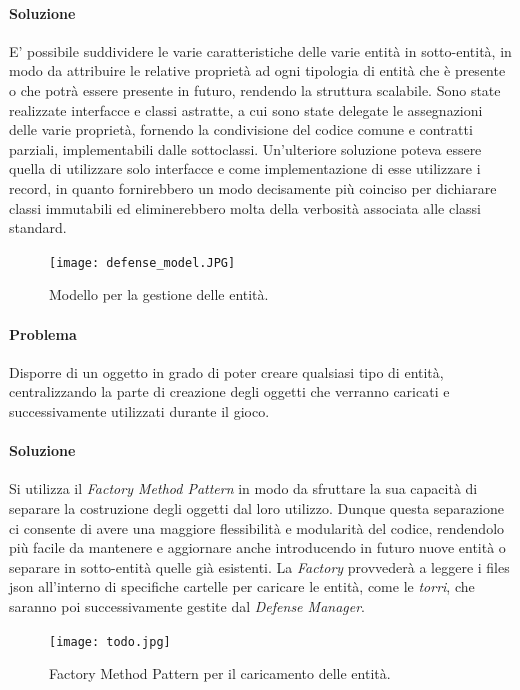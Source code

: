 \documentclass[a4paper,12pt]{report}
\begin{document}
\paragraph{Soluzione}
E' possibile suddividere le varie caratteristiche delle varie entità in sotto-entità, in modo da attribuire le relative proprietà ad ogni tipologia di entità che è presente
o che potrà essere presente in futuro, rendendo la struttura scalabile. Sono state realizzate interfacce e classi astratte, a cui sono state delegate le assegnazioni delle varie proprietà, fornendo la condivisione del codice comune e contratti parziali, implementabili dalle sottoclassi.
Un'ulteriore soluzione poteva essere quella di utilizzare solo interfacce e come implementazione di esse utilizzare i record, in quanto fornirebbero un modo decisamente più coinciso per dichiarare classi immutabili ed eliminerebbero molta della verbosità associata alle classi standard.

\begin{figure}[H]
    \centering
    \texttt{[image: defense\_model.JPG]}
    \caption{Modello per la gestione delle entità.}
    \label{fig:defense-model}
\end{figure}

\vspace{15mm}

\paragraph{Problema}
Disporre di un oggetto in grado di poter creare qualsiasi tipo di entità, centralizzando la parte di creazione degli oggetti che verranno caricati e successivamente utilizzati durante il gioco.

\paragraph{Soluzione}
Si utilizza il \textit{Factory Method Pattern} in modo da sfruttare la sua capacità di separare la costruzione degli oggetti dal loro utilizzo. Dunque questa separazione ci consente di avere una maggiore flessibilità e modularità del codice, rendendolo più facile da mantenere e aggiornare anche introducendo in futuro nuove entità o separare in sotto-entità quelle già esistenti. 
La \textit{Factory} provvederà a leggere i files json all'interno di specifiche cartelle per caricare
le entità, come le \textit{torri}, che saranno poi successivamente gestite dal \textit{Defense Manager}.


\begin{figure}[H]
    \centering
    \texttt{[image: todo.jpg]}
    \caption{Factory Method Pattern per il caricamento delle entità.}
    \label{fig:entity-factory-method}
\end{figure}
\vspace{25mm}
\end{document}
